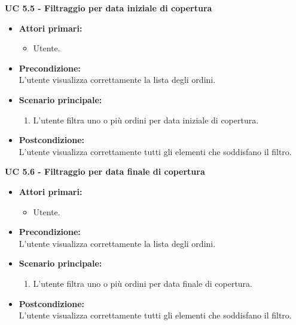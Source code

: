 \vspace{0.4cm}

\noindent \textbf{\large UC 5.5 - Filtraggio per data iniziale di copertura}
\label{uc:filtraggio-data-iniziale-copertura}
\begin{itemize}

	\item \textbf{Attori primari: }
		\begin{itemize}
			\item Utente.
		\end{itemize}

	\item \textbf{Precondizione: }\\[0.3cm]
		L'utente visualizza correttamente la lista degli ordini.

	\item \textbf{Scenario principale: }
		\begin{enumerate}
			\item L'utente filtra uno o più ordini per data iniziale di copertura.
		\end{enumerate}
		

	\item \textbf{Postcondizione: }\\[0.3cm]
		L'utente visualizza correttamente tutti gli elementi che soddisfano il filtro.

\end{itemize}

\vspace{0.4cm}

\newpage

\noindent \textbf{\large UC 5.6 - Filtraggio per data finale di copertura}
\label{uc:filtraggio-data-finale-copertura}
\begin{itemize}

	\item \textbf{Attori primari: }
		\begin{itemize}
			\item Utente.
		\end{itemize}

	\item \textbf{Precondizione: }\\[0.3cm]
		L'utente visualizza correttamente la lista degli ordini.

	\item \textbf{Scenario principale: }
		\begin{enumerate}
			\item L'utente filtra uno o più ordini per data finale di copertura.
		\end{enumerate}
		

	\item \textbf{Postcondizione: }\\[0.3cm]
		L'utente visualizza correttamente tutti gli elementi che soddisfano il filtro.

\end{itemize}


